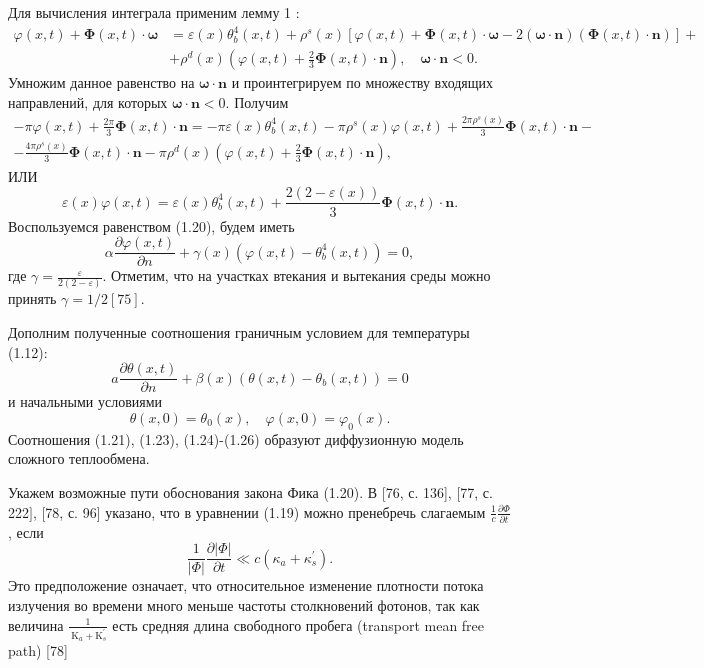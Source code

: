 Для вычисления интеграла применим лемму 1 :
\[
    \begin{aligned}
        \varphi(x, t)+\boldsymbol{\Phi}(x, t) \cdot \boldsymbol{\omega} &=\varepsilon(x) \theta_{b}^{4}(x, t)+\rho^{s}(x)[\varphi(x, t)+\boldsymbol{\Phi}(x, t) \cdot \boldsymbol{\omega}-2(\boldsymbol{\omega} \cdot \mathbf{n})(\boldsymbol{\Phi}(x, t) \cdot \mathbf{n})]+\\
        &+\rho^{d}(x)\left(\varphi(x, t)+\frac{2}{3} \boldsymbol{\Phi}(x, t) \cdot \mathbf{n}\right), \quad \boldsymbol{\omega} \cdot \mathbf{n}<0 .
    \end{aligned}
\]
Умножим данное равенство на $\boldsymbol{\omega} \cdot \mathbf{n}$ и проинтегрируем по множеству входящих направлений, для которых $\boldsymbol{\omega} \cdot \mathbf{n}<0$. Получим
\[
    \begin{gathered}
        -\pi \varphi(x, t)+\frac{2 \pi}{3} \boldsymbol{\Phi}(x, t) \cdot \mathbf{n}=
        -\pi \varepsilon(x) \theta_{b}^{4}(x, t)-\pi \rho^{s}(x) \varphi(x, t)+\frac{2 \pi \rho^{s}(x)}{3}
        \boldsymbol{\Phi}(x, t) \cdot \mathbf{n}- \\
        -\frac{4 \pi \rho^{s}(x)}{3} \boldsymbol{\Phi}(x, t) \cdot \mathbf{n}-\pi
        \rho^{d}(x)\left(\varphi(x, t)+\frac{2}{3} \boldsymbol{\Phi}(x, t) \cdot \mathbf{n}\right),
    \end{gathered}
\]
ИЛИ
\[
    \varepsilon(x) \varphi(x, t)=\varepsilon(x) \theta_{b}^{4}(x, t)+
    \frac{2(2-\varepsilon(x))}{3} \boldsymbol{\Phi}(x, t) \cdot \mathbf{n}.
\]
Воспользуемся равенством (1.20), будем иметь
\[
    \alpha \frac{\partial \varphi(x, t)}{\partial n}+\gamma(x)\left(\varphi(x, t)-\theta_{b}^{4}(x, t)\right)=0,
\]
где $\gamma=\frac{\varepsilon}{2(2-\varepsilon)}$.
Отметим, что на участках втекания и вытекания среды можно принять $\gamma=1 / 2[75]$.


Дополним полученные соотношения граничным условием для температуры (1.12):
\[
    a \frac{\partial \theta(x, t)}{\partial n}+\beta(x)\left(\theta(x, t)-\theta_{b}(x, t)\right)=0
\]
и начальными условиями
\[
    \theta(x, 0)=\theta_{0}(x), \quad \varphi(x, 0)=\varphi_{0}(x) .
\]
Соотношения (1.21), (1.23), (1.24)-(1.26) образуют диффузионную модель сложного теплообмена.

Укажем возможные пути обоснования закона Фика (1.20).
В [76, с. 136], [77, с. 222$]$, [78, с. 96] указано, что в уравнении (1.19) можно пренебречь
слагаемым $\frac{1}{c} \frac{\partial \Phi}{\partial t}$, если
\[
    \frac{1}{|\Phi|} \frac{\partial|\Phi|}{\partial t} \ll c\left(\kappa_{a}+\kappa_{s}^{\prime}\right).
\]
Это предположение означает, что относительное изменение плотности потока излучения во времени много
меньше частоты столкновений фотонов, так как величина
$\frac{1}{\mathrm{~K}_{a}+\mathrm{K}_{s}^{\prime}}$ есть средняя длина свободного пробега (transport mean free path) [78]


